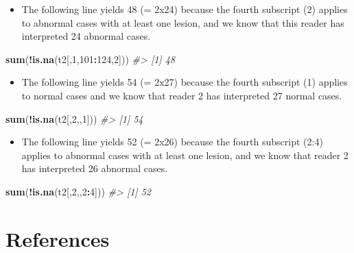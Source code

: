 \documentclass[]{book}
\newenvironment{Shaded}{\begin{snugshade}}{\end{snugshade}}
\newcommand{\CommentTok}[1]{\textcolor[rgb]{0.56,0.35,0.01}{\textit{#1}}}
\newcommand{\DecValTok}[1]{\textcolor[rgb]{0.00,0.00,0.81}{#1}}
\newcommand{\KeywordTok}[1]{\textcolor[rgb]{0.13,0.29,0.53}{\textbf{#1}}}
\newcommand{\NormalTok}[1]{#1}
\newcommand{\OperatorTok}[1]{\textcolor[rgb]{0.81,0.36,0.00}{\textbf{#1}}}
\providecommand{\tightlist}{%
  \setlength{\itemsep}{0pt}\setlength{\parskip}{0pt}}
\begin{document}
\begin{itemize}
\tightlist
\item
  The following line yields 48 (= 2x24) because the fourth subscript (2) applies to abnormal cases with at least one lesion, and we know that this reader has interpreted 24 abnormal cases.
\end{itemize}

\begin{Shaded}
\begin{Highlighting}[]
\KeywordTok{sum}\NormalTok{(}\OperatorTok{!}\KeywordTok{is.na}\NormalTok{(t2[,}\DecValTok{1}\NormalTok{,}\DecValTok{101}\OperatorTok{:}\DecValTok{124}\NormalTok{,}\DecValTok{2}\NormalTok{]))}
\CommentTok{#> [1] 48}
\end{Highlighting}
\end{Shaded}

\begin{itemize}
\tightlist
\item
  The following line yields 54 (= 2x27) because the fourth subscript (1) applies to normal cases and we know that reader 2 has interpreted 27 normal cases.
\end{itemize}

\begin{Shaded}
\begin{Highlighting}[]
\KeywordTok{sum}\NormalTok{(}\OperatorTok{!}\KeywordTok{is.na}\NormalTok{(t2[,}\DecValTok{2}\NormalTok{,,}\DecValTok{1}\NormalTok{]))}
\CommentTok{#> [1] 54}
\end{Highlighting}
\end{Shaded}

\begin{itemize}
\tightlist
\item
  The following line yields 52 (= 2x26) because the fourth subscript (2:4) applies to abnormal cases with at least one lesion, and we know that reader 2 has interpreted 26 abnormal cases.
\end{itemize}

\begin{Shaded}
\begin{Highlighting}[]
\KeywordTok{sum}\NormalTok{(}\OperatorTok{!}\KeywordTok{is.na}\NormalTok{(t2[,}\DecValTok{2}\NormalTok{,,}\DecValTok{2}\OperatorTok{:}\DecValTok{4}\NormalTok{]))}
\CommentTok{#> [1] 52}
\end{Highlighting}
\end{Shaded}

\hypertarget{references-14}{%
\section{References}\label{references-14}}


\end{document}
